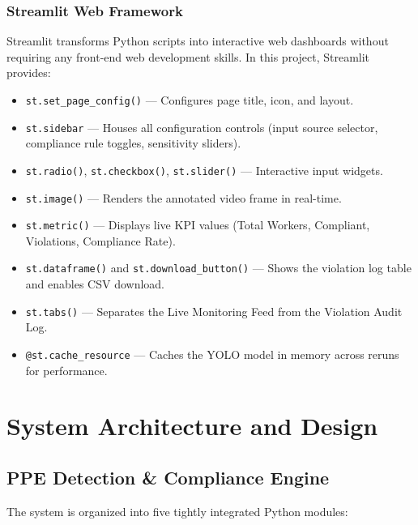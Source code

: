 \documentclass[12pt,a4paper]{report}
\begin{document}
\subsection{Streamlit Web Framework}
Streamlit transforms Python scripts into interactive web dashboards without requiring any front-end web development skills. In this project, Streamlit provides:
\begin{itemize}
    \item \texttt{st.set\_page\_config()} --- Configures page title, icon, and layout.
    \item \texttt{st.sidebar} --- Houses all configuration controls (input source selector, compliance rule toggles, sensitivity sliders).
    \item \texttt{st.radio()}, \texttt{st.checkbox()}, \texttt{st.slider()} --- Interactive input widgets.
    \item \texttt{st.image()} --- Renders the annotated video frame in real-time.
    \item \texttt{st.metric()} --- Displays live KPI values (Total Workers, Compliant, Violations, Compliance Rate).
    \item \texttt{st.dataframe()} and \texttt{st.download\_button()} --- Shows the violation log table and enables CSV download.
    \item \texttt{st.tabs()} --- Separates the Live Monitoring Feed from the Violation Audit Log.
    \item \texttt{@st.cache\_resource} --- Caches the YOLO model in memory across reruns for performance.
\end{itemize}

\chapter{System Architecture and Design}

\section{PPE Detection \& Compliance Engine}

The system is organized into five tightly integrated Python modules:
\end{document}
